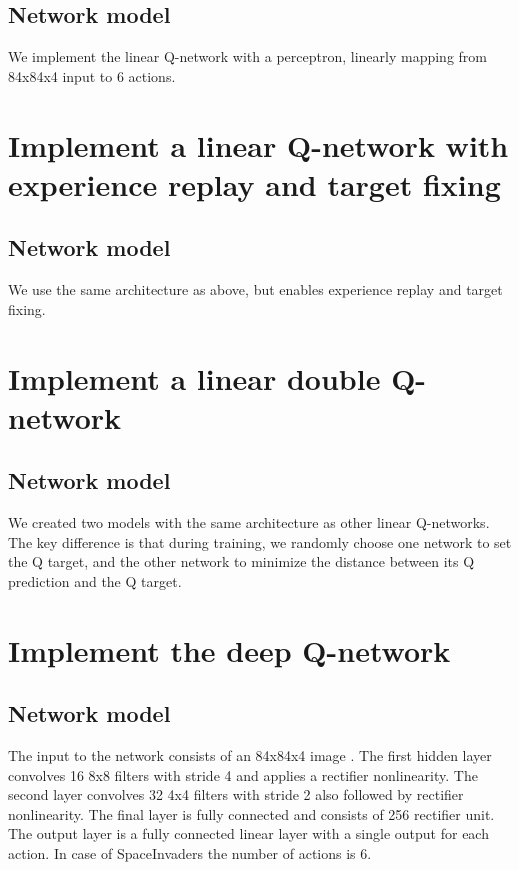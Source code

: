 \documentclass{article}
\begin{document}
\subsection*{Network model}
We implement the linear Q-network with a perceptron, linearly mapping from 84x84x4 input to 6 actions.

\section*{Implement a linear Q-network with experience replay and target fixing}
\subsection*{Network model} 
We use the same architecture as above, but enables experience replay and target fixing. 

\section*{Implement a linear double Q-network}
\subsection*{Network model}
We created two models with the same architecture as other linear Q-networks. The key difference is that during training, we randomly choose one network to set the Q target, and the 
other network to minimize the distance between its Q prediction and the Q target. 

\section*{Implement the deep Q-network}
\subsection*{Network model}
The input to the network consists of an 84x84x4 image . The first hidden layer convolves 16 8x8 filters with stride 4 and applies a rectifier nonlinearity. The second layer convolves 32 4x4 filters with stride 2 also followed by rectifier nonlinearity. The final layer is fully connected and consists of 256 rectifier unit. The output layer is a fully connected linear layer with a single output for each action. In case of SpaceInvaders the number of actions is 6.
\end{document}
